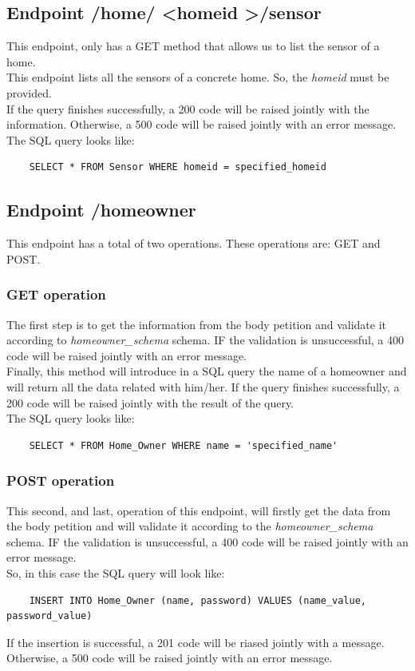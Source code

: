 \documentclass[a4paper,12pt]{article}
\begin{document}
\subsection*{Endpoint /home/ \textless homeid \textgreater /sensor}
This endpoint, only has a GET method that allows us to list the sensor of a home.\\
This endpoint lists all the sensors of a concrete home. So, the \textit{homeid} must be provided.\\
If the query finishes successfully, a 200 code will be raised jointly with the information. Otherwise, a 500 code will be raised jointly with an error message.
The SQL query looks like:
\begin{lstlisting}
    SELECT * FROM Sensor WHERE homeid = specified_homeid
\end{lstlisting}
\subsection*{Endpoint /homeowner}
This endpoint has a total of two operations. These operations are: GET and POST.
\subsubsection*{GET operation}
The first step is to get the information from the body petition and validate it according to \textit{homeowner\_schema} schema. IF the validation is unsuccessful, a 400 code will be raised jointly with an error message.\\
Finally, this method will introduce in a SQL query the name of a homeowner and will return all the data related with him/her. If the query finishes successfully, a 200 code will be raised jointly with the result of the query.\\
The SQL query looks like:
\begin{lstlisting}
    SELECT * FROM Home_Owner WHERE name = 'specified_name'
\end{lstlisting}
\subsubsection*{POST operation}
This second, and last, operation of this endpoint, will firstly get the data from the body petition and will validate it according to the \textit{homeowner\_schema} schema. IF the validation is unsuccessful, a 400 code will be raised jointly with an error message.\\
So, in this case the SQL query will look like:
\begin{lstlisting}
    INSERT INTO Home_Owner (name, password) VALUES (name_value, password_value)
\end{lstlisting}
If the insertion is successful, a 201 code will be riased jointly with a message. Otherwise, a 500 code will be raised jointly with an error message.
\end{document}
